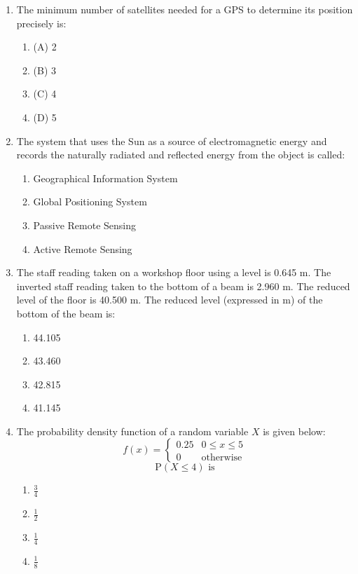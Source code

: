 \documentclass[journal]{IEEEtran}
\begin{document}
\begin{enumerate}
    \item The minimum number of satellites needed for a GPS to determine its position precisely is:
    \begin{multicols}{4}
        \begin{enumerate}
            \item (A) 2
            \item (B) 3
            \item (C) 4
            \item (D) 5
        \end{enumerate}
            \end{multicols}
    \item The system that uses the Sun as a source of electromagnetic energy and records the naturally radiated and reflected energy from the object is called:
        \begin{enumerate}
            \item  Geographical Information System
            \item  Global Positioning System
            \item  Passive Remote Sensing
            \item  Active Remote Sensing
        \end{enumerate}
    \item The staff reading taken on a workshop floor using a level is 0.645 m. The inverted staff reading taken to the bottom of a beam is 2.960 m. The reduced level of the floor is 40.500 m. The reduced level (expressed in m) of the bottom of the beam is:
    \begin{multicols}{4}
        \begin{enumerate}
            \item  44.105
            \item  43.460
            \item  42.815
            \item  41.145
        \end{enumerate}
            \end{multicols}
\begin{large}
\end{large}
    \item The probability density function of a random variable $X$ is given below:
\[
        f(x) = 
        \begin{cases}
            0.25 &  0 \leq x \leq 5 \\
            0 & \text{otherwise}
        \end{cases}
\]
\[
\text{P}(X \leq 4) \text{ is}
\]
\begin{multicols}{4}
\begin{enumerate}
    \item $\frac{3}{4}$
    \item $\frac{1}{2}$
    \item $\frac{1}{4}$
    \item $\frac{1}{8}$
    \end{enumerate}
    \end{multicols}
\end{enumerate}
\end{document}

